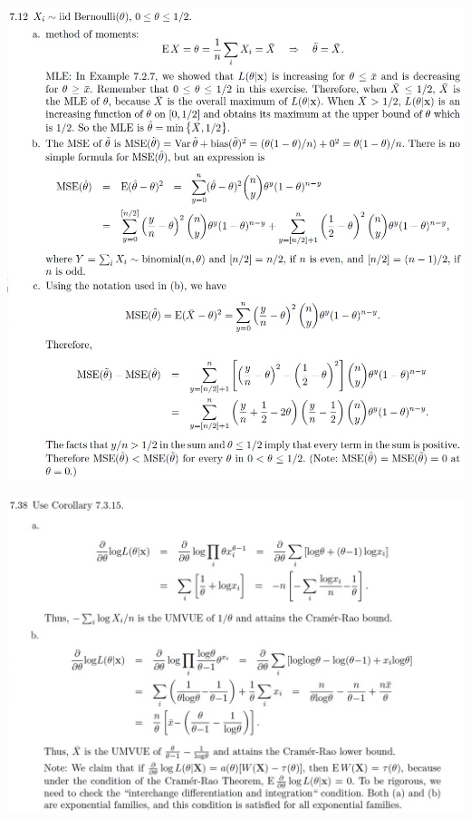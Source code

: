 \documentclass[letter,11pt]{article}
\begin{document}
\includegraphics[scale=0.5]{gabarito_casella7_12.jpg}

\includegraphics[scale=0.5]{gabarito_casella7_38.jpg}
\end{document}
